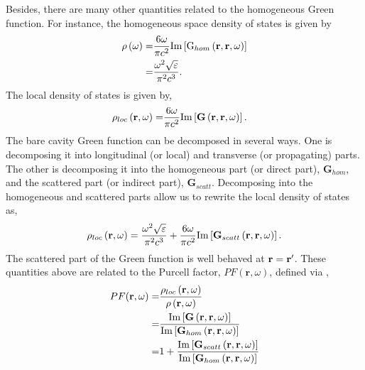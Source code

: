 Besides, there are many other quantities related to the homogeneous Green function.
For instance, the homogeneous space density of states is given by
\begin{equation}
\begin{split}
 \rho \left(\omega\right) =& \frac{6 \omega}{\pi c^2} {\rm Im} \left[ {\rm G}_{hom} \left(\mathbf{r},\mathbf{r},\omega\right)\right]\\
 =& \frac{\omega^2 \sqrt{\varepsilon}}{\pi^2 c^3}.
\end{split}
\end{equation}
The local density of states is given by,
\begin{equation}
\begin{split}
 \rho_{loc} \left(\mathbf{r}, \omega\right) =& \frac{6 \omega}{\pi c^2} {\rm Im} \left[ \mathbf{G} \left(\mathbf{r},\mathbf{r},\omega\right)\right].
 \end{split}
\end{equation}
The bare cavity Green function can be decomposed in several ways. One is decomposing it into longitudinal (or local) and transverse (or propagating) parts. The other is decomposing it into the homogeneous part (or direct part), $\mathbf{G}_{hom}$,
and the scattered part (or indirect part), $\mathbf{G}_{scatt}$.
Decomposing into the homogeneous and scattered parts allow us to rewrite the local density of states as,
\begin{equation}
\begin{split}
 \rho_{loc} \left(\mathbf{r}, \omega\right) =\frac{\omega^2 \sqrt{\varepsilon}}{\pi^2 c^3}+ \frac{6 \omega}{\pi c^2} {\rm Im} \left[ \mathbf{G}_{scatt} \left(\mathbf{r},\mathbf{r},\omega\right)\right].
 \end{split}
\end{equation}
The scattered part of the Green function is well behaved at $\mathbf{r} = \mathbf{r}'$. These quantities above are related to the Purcell factor, $PF(\mathbf{r},\omega)$, defined
via \cite{Purcell1946},
\begin{equation}
\begin{split}
 PF(\mathbf{r},\omega) =& \frac{\rho_{loc} \left(\mathbf{r}, \omega\right)}{\rho \left(\mathbf{r}, \omega\right)}\\
=& \frac{{\rm Im} \left[\mathbf{G} \left(\mathbf{r},\mathbf{r},\omega\right)\right] }{{\rm Im} \left[\mathbf{G}_{hom} \left(\mathbf{r},\mathbf{r},\omega\right)\right]}\\
=& 1+ \frac{{\rm Im} \left[\mathbf{G}_{scatt} \left(\mathbf{r},\mathbf{r},\omega\right)\right] }{{\rm Im} \left[\mathbf{G}_{hom} \left(\mathbf{r},\mathbf{r},\omega\right)\right]}\\
 \end{split}
\end{equation}
